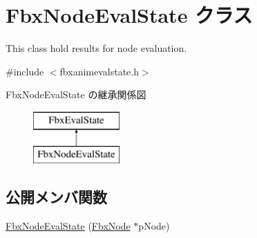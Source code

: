 \hypertarget{class_fbx_node_eval_state}{}\section{Fbx\+Node\+Eval\+State クラス}
\label{class_fbx_node_eval_state}


This class hold results for node evaluation.  




{\ttfamily \#include $<$fbxanimevalstate.\+h$>$}

Fbx\+Node\+Eval\+State の継承関係図\begin{figure}[H]
\begin{center}
\leavevmode
\includegraphics[height=2.000000cm]{class_fbx_node_eval_state}
\end{center}
\end{figure}
\subsection*{公開メンバ関数}
\begin{DoxyCompactItemize}
\item 
\hyperlink{class_fbx_node_eval_state_af0a429632794570efff26a30fc94b5e0}{Fbx\+Node\+Eval\+State} (\hyperlink{class_fbx_node}{Fbx\+Node} $\ast$p\+Node)
\end{DoxyCompactItemize}

